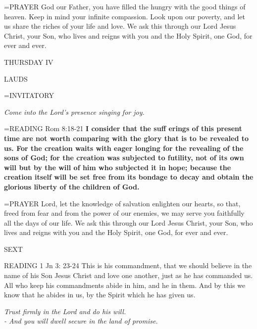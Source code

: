 \hangindent=\parindent \small{PRAYER  God our Father, you have filled the hungry with the good things of heaven. Keep in mind your infinite compassion. Look upon our poverty, and let us share the riches of your life and love.  We ask this through our Lord Jesus Christ, your Son, who lives and reigns with you and the Holy Spirit, one God, for ever and ever.}

\begin{center}
\normalsize THURSDAY IV
\end{center}

\begin{flushleft}\normalsize LAUDS\\\end{flushleft}

\hangindent=\parindent \small{INVITATORY}
\begin{center}
\textit{Come into the Lord’s presence singing for joy.\\}
\end{center}

\hangindent=\parindent \small{READING} Rom 8:18-21 \textbf{I consider that the suff erings of this present time are not worth comparing with the glory that is to be revealed to us. For the creation waits with eager longing for the revealing of the sons of God; for the creation was subjected to futility, not of its own will but by the will of him who subjected it in hope; because the creation itself will be set free from its bondage to decay and obtain the glorious liberty of the children of God.\\}

\hangindent=\parindent \small{PRAYER  Lord, let the knowledge of salvation enlighten our hearts, so that, freed from fear and from the power of our enemies, we may serve you faithfully all the days of our life. We ask this through our Lord Jesus Christ, your Son, who lives and reigns with you and the Holy Spirit, one God, for ever and ever.}

\begin{flushleft}\normalsize SEXT\\\end{flushleft}

READING 1 Jn 3: 23-24 This is his commandment, that we should believe in the name of his Son Jesus Christ and love one another, just as he has commanded us. All who keep his commandments abide in him, and he in them. And by this we know that he abides in us, by the Spirit which he has given us.

\begin{center}
\textit{Trust firmly in the Lord and do his will.\\
- And you will dwell secure in the land of promise.}
\end{center}

